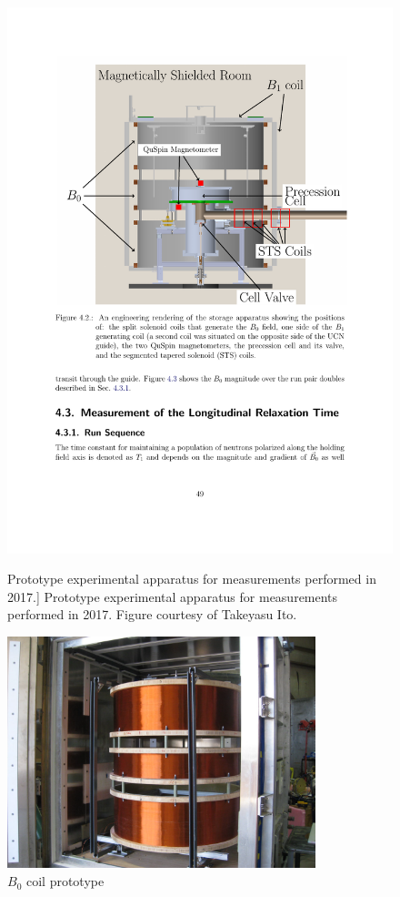 \begin{figure}
\centering
\begin{minipage}{.5\textwidth}
    \centering
    \includegraphics[width=\textwidth]{figures/ramsey2017_apparatus.pdf}
    \caption
    [Prototype experimental apparatus for measurements performed in 2017.]
    {Prototype experimental apparatus for measurements performed in 2017. Figure courtesy of Takeyasu Ito.}
    \label{fig:ramsey_2017_apparatus}
\end{minipage}%
\begin{minipage}{.5\textwidth}
    \centering
    \includegraphics[width=0.8\textwidth]{figures/ramsey2017_B0_coil.png}
    \caption
    {$B_0$ coil prototype}
    \label{fig:ramsey_2017_B0_coil_prototype}
\end{minipage}
\end{figure}

